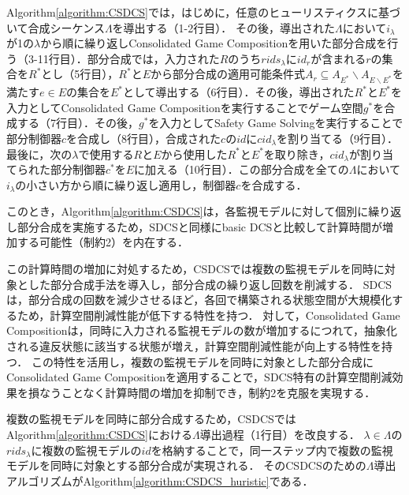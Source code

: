 Algorithm\ref{algorithm:CSDCS}では，はじめに，任意のヒューリスティクスに基づいて合成シーケンス$\Lambda$を導出する（1-2行目）．
その後，導出された$\Lambda$において$i_{\lambda}$が1の$\lambda$から順に繰り返しConsolidated Game Compositionを用いた部分合成を行う（3-11行目）．部分合成では，入力された$R$のうち$rids_{\lambda}$に$id_{r}$が含まれる$r$の集合を$R^*$とし（5行目），$R^*$と$E$から部分合成の適用可能条件式$A_{r} \subseteq A_{E^*} \backslash A_{E \backslash E^*}$を満たす$e \in E$の集合を$E^*$として導出する（6行目）．その後，導出された$R^*$と$E^*$を入力としてConsolidated Game Compositionを実行することでゲーム空間$g^*$を合成する（7行目）．その後，$g^*$を入力としてSafety Game Solvingを実行することで部分制御器$c$を合成し（8行目），合成された$c$の$id$に$cid_{\lambda}$を割り当てる（9行目）．最後に，次の$\lambda$で使用する$R$と$E$から使用した$R^*$と$E^*$を取り除き，$cid_{\lambda}$が割り当てられた部分制御器$c^*$を$E$に加える（10行目）．この部分合成を全ての$\Lambda$において$i_{\lambda}$の小さい方から順に繰り返し適用し，制御器$c$を合成する．

このとき，Algorithm\ref{algorithm:CSDCS}は，各監視モデルに対して個別に繰り返し部分合成を実施するため，SDCSと同様にbasic DCSと比較して計算時間が増加する可能性（制約2）を内在する．

この計算時間の増加に対処するため，CSDCSでは複数の監視モデルを同時に対象とした部分合成手法を導入し，部分合成の繰り返し回数を削減する．
SDCSは，部分合成の回数を減少させるほど，各回で構築される状態空間が大規模化するため，計算空間削減性能が低下する特性を持つ．
対して，Consolidated Game Compositionは，同時に入力される監視モデルの数が増加するにつれて，抽象化される違反状態に該当する状態が増え，計算空間削減性能が向上する特性を持つ．
この特性を活用し，複数の監視モデルを同時に対象とした部分合成にConsolidated Game Compositionを適用することで，SDCS特有の計算空間削減効果を損なうことなく計算時間の増加を抑制でき，制約2を克服を実現する．

複数の監視モデルを同時に部分合成するため，CSDCSではAlgorithm\ref{algorithm:CSDCS}における$\Lambda$導出過程（1行目）を改良する．
$\lambda \in \Lambda$の$rids_{\lambda}$に複数の監視モデルの$id$を格納することで，同一ステップ内で複数の監視モデルを同時に対象とする部分合成が実現される．
そのCSDCSのための$\Lambda$導出アルゴリズムがAlgorithm\ref{algorithm:CSDCS_huristic}である．

